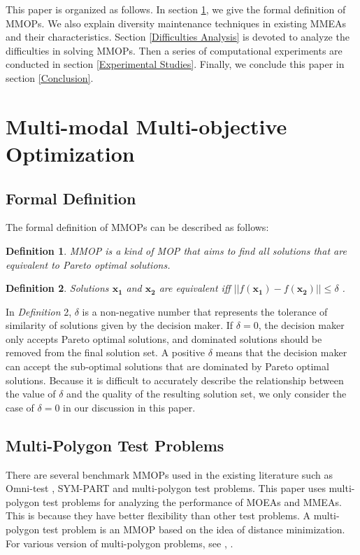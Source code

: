 \documentclass[conference]{IEEEtran}
\newtheorem{definition}{Definition}
\begin{document}
This paper is organized as follows. In section \ref{Multi-modal Multi-objective Optimization}, we give the formal definition of MMOPs. We also explain diversity maintenance techniques in existing MMEAs and their characteristics. Section \ref{Difficulties Analysis} is devoted to analyze the difficulties in solving MMOPs. Then a series of computational experiments are conducted in section \ref{Experimental Studies}. Finally, we conclude this paper in section \ref{Conclusion}.
\section{Multi-modal Multi-objective Optimization}
\label{Multi-modal Multi-objective Optimization}
\subsection{Formal Definition}
The formal definition of MMOPs can be described as follows\cite{tanabe2019review}:
\begin{definition}
MMOP is a kind of MOP that aims to find all solutions that are equivalent to Pareto optimal solutions. 
\end{definition}
\begin{definition}
Solutions $\boldsymbol{x_1}$ and  $\boldsymbol{x_2}$ are equivalent  iff $||f(\boldsymbol{x_1}) - f(\boldsymbol{x_2})|| \leq \delta$ .
\end{definition}

In \textit{Definition} 2, $\delta$ is a non-negative number that represents the tolerance of similarity of solutions given by the decision maker. If $\delta = 0$, the decision maker only accepts Pareto optimal solutions, and dominated solutions should be removed from the final solution set. A positive $\delta$ means that the decision maker can accept the sub-optimal solutions that are dominated by Pareto optimal solutions. Because it is difficult to accurately describe the relationship between the value of $\delta$ and the quality of the resulting solution set, we only consider the case of $\delta =0$ in our discussion in this paper. 

\subsection{Multi-Polygon Test Problems}
There are several benchmark MMOPs used in the existing literature such as Omni-test \cite{deb2005omni} , SYM-PART \cite{rudolph2007capabilities} and multi-polygon\cite{ishibuchi2019salable} test problems. This paper uses multi-polygon test problems for analyzing the performance of MOEAs and MMEAs. This is because they have better flexibility than other test problems. A multi-polygon test problem is an MMOP based on the idea of distance minimization. For various version of multi-polygon problems, see \cite{fieldsend2019feature}, \cite{nojima2019constrained}.
\end{document}
